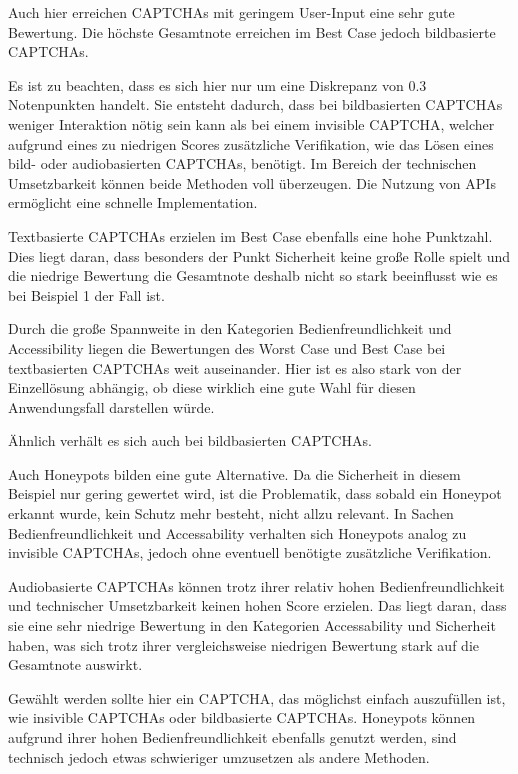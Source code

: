 Auch hier erreichen CAPTCHAs mit geringem User-Input eine sehr gute Bewertung.
Die höchste Gesamtnote erreichen im Best Case jedoch bildbasierte CAPTCHAs.

Es ist zu beachten, dass es sich hier nur um eine Diskrepanz von 0.3 Notenpunkten handelt. 
Sie entsteht dadurch, dass bei bildbasierten CAPTCHAs weniger Interaktion nötig sein kann als bei einem invisible CAPTCHA,
welcher aufgrund eines zu niedrigen Scores zusätzliche Verifikation, 
wie das Lösen eines bild- oder audiobasierten CAPTCHAs, benötigt.
Im Bereich der technischen Umsetzbarkeit können beide Methoden voll überzeugen. 
Die Nutzung von APIs ermöglicht eine schnelle Implementation.

Textbasierte CAPTCHAs erzielen im Best Case ebenfalls eine hohe Punktzahl. 
Dies liegt daran, dass besonders der Punkt Sicherheit keine große Rolle spielt
und die niedrige Bewertung die Gesamtnote deshalb nicht so stark beeinflusst wie es bei Beispiel 1 der Fall ist. 

Durch die große Spannweite in den Kategorien Bedienfreundlichkeit und Accessibility
liegen die Bewertungen des Worst Case und Best Case bei textbasierten CAPTCHAs weit auseinander.
Hier ist es also stark von der Einzellösung abhängig, ob diese wirklich eine gute Wahl für diesen Anwendungsfall darstellen würde.

Ähnlich verhält es sich auch bei bildbasierten CAPTCHAs. 

Auch Honeypots bilden eine gute Alternative. 
Da die Sicherheit in diesem Beispiel nur gering gewertet wird, ist die Problematik, dass sobald ein Honeypot erkannt wurde,
kein Schutz mehr besteht, nicht allzu relevant. 
In Sachen Bedienfreundlichkeit und Accessability verhalten sich Honeypots analog zu invisible CAPTCHAs,
jedoch ohne eventuell benötigte zusätzliche Verifikation.

Audiobasierte CAPTCHAs können trotz ihrer relativ hohen Bedienfreundlichkeit und technischer Umsetzbarkeit keinen hohen Score erzielen.
Das liegt daran, dass sie eine sehr niedrige Bewertung in den Kategorien Accessability und Sicherheit haben,
was sich trotz ihrer vergleichsweise niedrigen Bewertung stark auf die Gesamtnote auswirkt.

Gewählt werden sollte hier ein CAPTCHA, das möglichst einfach auszufüllen ist, wie insivible CAPTCHAs oder bildbasierte CAPTCHAs. 
Honeypots können aufgrund ihrer hohen Bedienfreundlichkeit ebenfalls genutzt werden, 
sind technisch jedoch etwas schwieriger umzusetzen als andere Methoden.